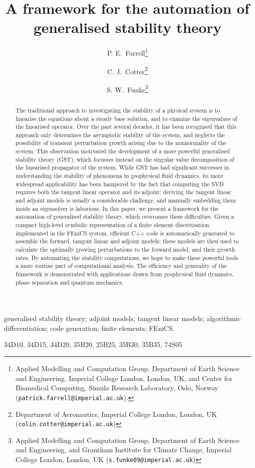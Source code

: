 \documentclass{siamltex}
\title{A framework for the automation of generalised stability theory}
\author{P. E.\ Farrell\thanks{Applied Modelling and Computation Group, Department of Earth Science and Engineering, Imperial College London, London, UK, and Center for Biomedical Computing, Simula Research Laboratory, Oslo, Norway ({\tt patrick.farrell@imperial.ac.uk}).}
        \and C. J.\ Cotter\thanks{Department of Aeronautics, Imperial College London, London, UK ({\tt colin.cotter@imperial.ac.uk})}
        \and S. W.\ Funke\thanks{Applied Modelling and Computation Group, Department of Earth Science and Engineering, and Grantham Institute for Climate Change, Imperial College London, London, UK ({\tt s.funke09@imperial.ac.uk})}}
\begin{document}
  \maketitle

  \begin{abstract}
The traditional approach to investigating the stability of a physical system is to linearise the
equations about a steady base solution, and to examine the eigenvalues of the linearised operator.  Over
the past several decades, it has been recognised that this approach only determines the asymptotic
stability of the system, and neglects the possibility of transient perturbation growth arising due
to the nonnormality of the system. This observation motivated the development of a more powerful
generalised stability theory (GST), which focusses instead on the singular value decomposition of
the linearised propagator of the system. While GST has had significant successes in understanding
the stability of phenomena in geophysical fluid dynamics, its more widespread applicability has been
hampered by the fact that computing the SVD requires both the tangent linear operator and its
adjoint: deriving the tangent linear and adjoint models is usually a considerable challenge, and
manually embedding them inside an eigensolver is laborious. In this paper, we present a framework
for the automation of generalised stability theory, which overcomes these difficulties. Given a
compact high-level symbolic representation of a finite element discretisation implemented in the FEniCS system, 
efficient C++ code is automatically generated to assemble the forward, tangent linear and
adjoint models; these models are then used to calculate the optimally growing perturbations to the
forward model, and their growth rates. By automating the stability computations, we hope to make
these powerful tools a more routine part of computational analysis. The efficiency and generality of the
framework is demonstrated with applications drawn from geophysical fluid dynamics, phase separation
and quantum mechanics.
  \end{abstract}

  \begin{keywords}
  generalised stability theory; adjoint models; tangent linear models; algorithmic differentiation; code generation; finite elements; FEniCS.
  \end{keywords}

  \begin{AMS}
  34D10, 34D15, 34D20, 35B20, 25B25, 35B30, 35B35, 74S05
  \end{AMS}
\end{document}
